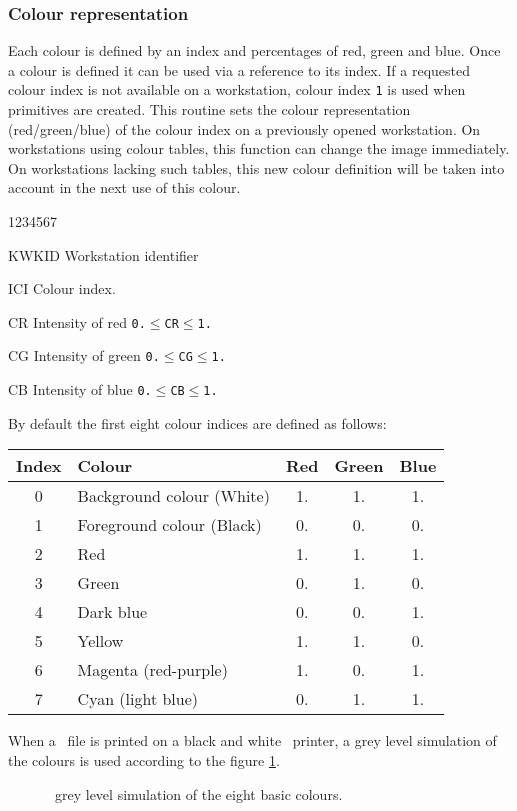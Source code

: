 \subsubsection{Colour representation}
Each colour is defined by an index and percentages of red, green and blue.
Once a colour is defined it can be used via a reference to its index. If a
requested colour index is not available on a workstation, colour index {\tt 1}
is used when primitives are created.
\Action
This routine sets the colour representation (red/green/blue) of the colour index
on a previously opened workstation. On workstations using colour tables, this
function can change the image immediately. On workstations lacking such tables,
this new colour definition will be taken into account in the next use of this
colour.
\Pdesc
\begin{DLtt}{1234567}
\item[KWKID] Workstation identifier
\item[ICI]   Colour index.
\item[CR]    Intensity of red {\tt0.$\leq$CR$\leq$1.}
\item[CG]    Intensity of green {\tt0.$\leq$CG$\leq$1.}
\item[CB]    Intensity of blue {\tt0.$\leq$CB$\leq$1.}
\end{DLtt}
By default the first eight colour indices are defined as follows:
\begin{center}
\begin{tabular}{||c|l|c|c|c||}
\hline
Index & Colour & Red & Green & Blue \\
\hline
0 & Background colour (White) & 1. & 1. & 1. \\
1 & Foreground colour (Black) & 0. & 0. & 0. \\
2 & Red                       & 1. & 1. & 1. \\
3 & Green                     & 0. & 1. & 0. \\
4 & Dark blue                 & 0. & 0. & 1. \\
5 & Yellow                    & 1. & 1. & 0. \\
6 & Magenta (red-purple)      & 1. & 0. & 1. \\
7 & Cyan (light blue)         & 0. & 1. & 1. \\
\hline
\end{tabular}
\end{center}
%
When a \PS~file is printed on a black and white \PS~printer, a grey level
simulation of the colours is used according to the
figure \ref{COLPS}.
\begin{figure}[t]
\mbox{}
\caption{\PS~grey level simulation of the eight basic colours.}
\label{COLPS}
\end{figure}
%
